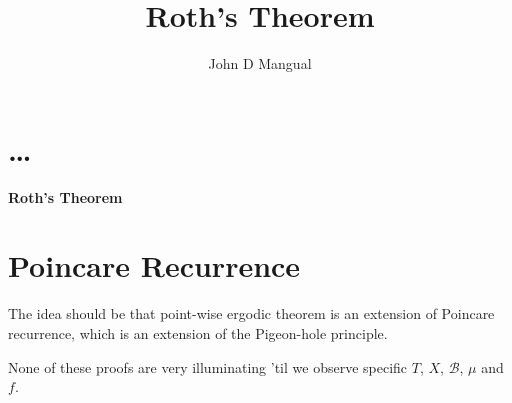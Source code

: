\documentclass[12pt]{article}
\title{\textbf{ Roth's Theorem}}
\author{John D Mangual}
\date{}
\begin{document}
{ \selectfont

\maketitle

\section{  \selectfont \dots }

\textbf{Roth's Theorem} 

\section{  \selectfont Poincare Recurrence }

The idea should be that point-wise ergodic theorem is an extension of Poincare recurrence, which is an extension of the Pigeon-hole principle.  \newline

 \vspace{0.125in} \newline 
None of these proofs are very illuminating 'til we observe specific $T$, $X$, $\mathcal{B}$, $\mu$ and $f$. \newline

}
\end{document}
